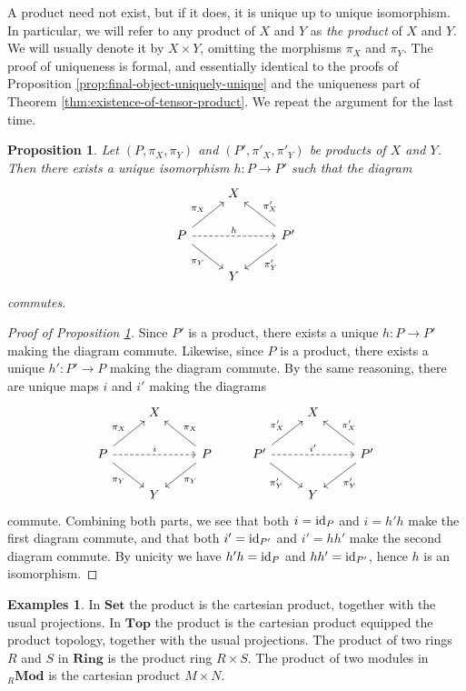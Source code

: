\documentclass[11pt]{amsbook}
\DeclareMathOperator\Mod{{\bf{Mod}}}
\def\id{{\rm id}}
\def\Set{\mathbf{Set}}
\def\Top{\mathbf{Top}}
\def\Ring{\mathbf{Ring}}
\def\Mod{\mathbf{Mod}}
\theoremstyle{plain}
\newtheorem{proposition}[theorem]{Proposition}
\theoremstyle{definition}
\newtheorem{examples}[theorem]{Examples}
\begin{document}
A product need not exist, but if it does, it is unique up to unique isomorphism. In particular, we will refer to any product of $X$ and $Y$ as \emph{the product} of $X$ and $Y$. We will usually denote it by $X\times Y$, omitting the morphisms $\pi_X$ and $\pi_Y$. The proof of uniqueness is formal, and essentially identical to the proofs of Proposition  \ref{prop:final-object-uniquely-unique} and the uniqueness part of Theorem
\ref{thm:existence-of-tensor-product}. We repeat the argument for the last time.

\begin{proposition}\label{prop:product-uniquely-unique}
Let $(P,\pi_X,\pi_Y)$ and $(P',\pi'_X,\pi'_Y)$ be products of $X$ and $Y$. Then there exists a unique isomorphism $h\colon P \to P'$ such that the diagram
\[
\begin{tikzcd}
& X & \\
P \arrow{ru}{\pi_X} \arrow[swap]{rd}{\pi_Y} \arrow[dashed]{rr}{h}
	 & &  P' \arrow[swap]{lu}{\pi'_X} \arrow{ld}{\pi'_Y} \\
& Y &
\end{tikzcd}
\]
commutes.
\end{proposition}


\begin{proof}[Proof of Proposition \ref{prop:product-uniquely-unique}]
Since $P'$ is a product, there exists a unique $h\colon P \to P'$ making the diagram commute. Likewise, since $P$ is a product, there exists a unique $h'\colon P'\to P$ making the diagram commute. By the same reasoning, there are unique maps $i$ and $i'$ making the diagrams
\[
\begin{tikzcd}
& X & & & X & \\
P \arrow{ru}{\pi_X} \arrow[swap]{rd}{\pi_Y} \arrow[dashed]{rr}{i}
	 & &  P \arrow[swap]{lu}{\pi_X} \arrow{ld}{\pi_Y} 
& P' \arrow{ru}{\pi'_X} \arrow[swap]{rd}{\pi'_Y} \arrow[dashed]{rr}{i'}
	 & &  P' \arrow[swap]{lu}{\pi_X'} \arrow{ld}{\pi_Y'} \\
& Y & & & Y &
\end{tikzcd}
\]
commute. Combining both parts, we see that both $i=\id_P$ and $i=h'h$ make the first diagram commute, and that both $i'=\id_{P'}$ and $i'=hh'$ make the second diagram commute. By unicity we have $h'h=\id_P$ and $hh'=\id_{P'}$, hence $h$ is an isomorphism.
\end{proof}


\begin{examples}
In $\Set$ the product is the cartesian product, together with the usual projections. In $\Top$ the product is the cartesian product equipped the product topology, together with the usual projections. The product of two rings  $R$ and $S$ in $\Ring$ is the product ring $R\times S$.  The product of two modules in ${}_R\Mod$ is the cartesian product  $M \times N$.
\end{examples}
\end{document}
